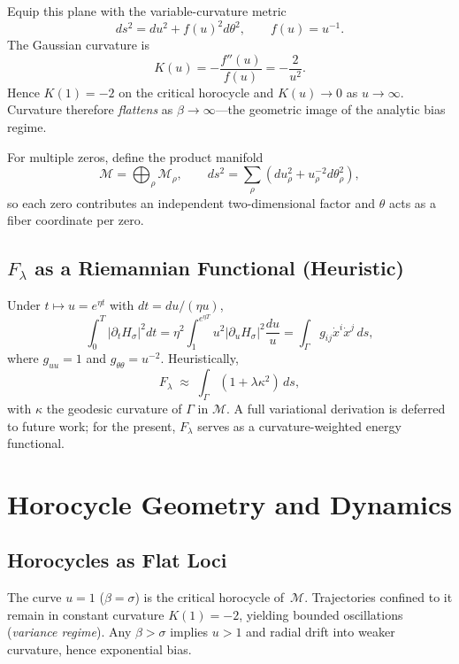 Equip this plane with the variable-curvature metric
\begin{equation}
ds^2 = du^2 + f(u)^2 d\theta^2, \qquad f(u)=u^{-1}.
\tag{16.1}
\end{equation}
The Gaussian curvature is
\begin{equation}
K(u)=-\frac{f''(u)}{f(u)}=-\frac{2}{u^2}.
\tag{16.2}
\end{equation}
Hence $K(1)=-2$ on the critical horocycle and $K(u)\to0$ as $u\to\infty$.
Curvature therefore \emph{flattens} as $\beta\to\infty$—the geometric image
of the analytic bias regime.

For multiple zeros, define the product manifold
\[
\mathcal{M}=\bigoplus_\rho \mathcal{M}_\rho,
\qquad
ds^2=\sum_\rho (du_\rho^2 + u_\rho^{-2} d\theta_\rho^2),
\tag{16.3}
\]
so each zero contributes an independent two-dimensional factor and
$\theta$ acts as a fiber coordinate per zero.

\subsection{\texorpdfstring{$F_\lambda$}{Fλ} as a Riemannian Functional (Heuristic)}

Under $t\mapsto u=e^{\eta t}$ with $dt=du/(\eta u)$,
\[
\int_0^T |\partial_t H_\sigma|^2dt
 = \eta^2\!\!\int_1^{e^{\eta T}} u^2 |\partial_u H_\sigma|^2 \frac{du}{u}
 = \int_\Gamma g_{ij}\dot{x}^i\dot{x}^j\,ds,
\]
where $g_{uu}=1$ and $g_{\theta\theta}=u^{-2}$.
Heuristically,
\[
F_\lambda \;\approx\;
 \int_\Gamma (1+\lambda\kappa^2)\,ds ,
\]
with $\kappa$ the geodesic curvature of $\Gamma$ in $\mathcal{M}$.
A full variational derivation is deferred to future work; for the present,
$F_\lambda$ serves as a curvature-weighted energy functional.

\section{Horocycle Geometry and Dynamics}

\subsection{Horocycles as Flat Loci}

The curve $u=1$ ($\beta=\sigma$) is the critical horocycle of~$\mathcal{M}$.
Trajectories confined to it remain in constant curvature $K(1)=-2$,
yielding bounded oscillations (\emph{variance regime}).
Any $\beta>\sigma$ implies $u>1$ and radial drift into weaker curvature,
hence exponential bias.

